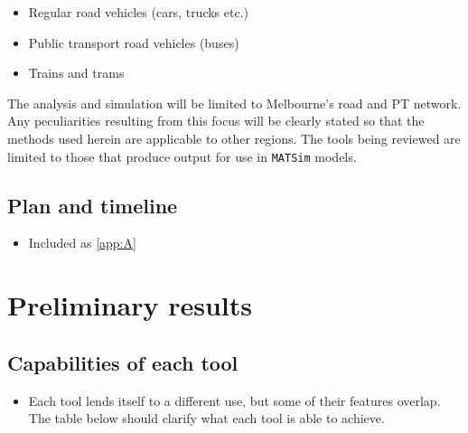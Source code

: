 \documentclass[11pt]{article}
\begin{document}
\begin{itemize}
\item Regular road vehicles (cars, trucks etc.)
\item Public transport road vehicles (buses)
\item Trains and trams
\end{itemize}

The analysis and simulation will be limited to Melbourne’s road and PT network. Any peculiarities resulting from this focus will be clearly stated so that the methods used herein are applicable to other regions.
The tools being reviewed are limited to those that produce output for use in \texttt{MATSim} models.
\subsection{Plan and timeline}
\label{sec:org17b2b55}
\begin{itemize}
\item Included as \cref{app:A}
\end{itemize}
\section{Preliminary results}
\label{sec:org480dbab}
\subsection{Capabilities of each tool}
\label{sec:org9bdba09}
\begin{itemize}
\item Each tool lends itself to a different use, but some of their features overlap. The table below should clarify what each tool is able to achieve.
\end{itemize}
\end{document}

